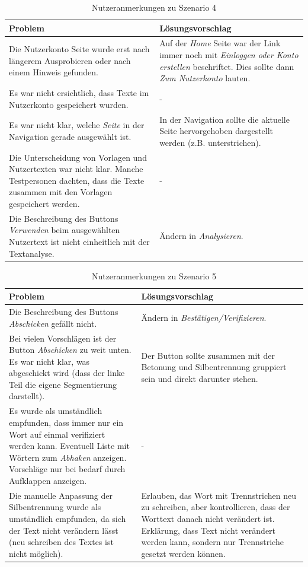 \begin{table}
	\centering
	\begin{tabular}{|p{}|p{}|}
		\hline
		\textbf{Problem} & \textbf{Lösungsvorschlag}\\
		\hline
		\hline
		Die Nutzerkonto Seite wurde erst nach längerem Ausprobieren oder nach einem Hinweis gefunden. & Auf der \textit{Home} Seite war der Link immer noch mit \textit{Einloggen oder Konto erstellen} beschriftet. Dies sollte dann \textit{Zum Nutzerkonto} lauten.\\
		\hline
		Es war nicht ersichtlich, dass Texte im Nutzerkonto gespeichert wurden. & -\\
		\hline
		Es war nicht klar, welche \textit{Seite} in der Navigation gerade ausgewählt ist. & In der Navigation sollte die aktuelle Seite hervorgehoben dargestellt werden (z.B. unterstrichen).\\
		\hline
		Die Unterscheidung von Vorlagen und Nutzertexten war nicht klar. Manche Testpersonen dachten, dass die Texte zusammen mit den Vorlagen gespeichert werden. & -\\
		\hline
		Die Beschreibung des Buttons \textit{Verwenden} beim ausgewählten Nutzertext ist nicht einheitlich mit der Textanalyse. & Ändern in \textit{Analysieren}.\\
		\hline
	\end{tabular}
	\caption{Nutzeranmerkungen zu Szenario 4}
	\label{table:szenario4}
\end{table}


\begin{table}
	\centering
	\begin{tabular}{|p{}|p{}|}
		\hline
		\textbf{Problem} & \textbf{Lösungsvorschlag}\\
		\hline
		\hline
		Die Beschreibung des Buttons \textit{Abschicken} gefällt nicht. & Ändern in \textit{Bestätigen/Verifizieren}.\\
		\hline
		Bei vielen Vorschlägen ist der Button \textit{Abschicken} zu weit unten. Es war nicht klar, was abgeschickt wird (dass der linke Teil die eigene Segmentierung darstellt). & Der Button sollte zusammen mit der Betonung und Silbentrennung gruppiert sein und direkt darunter stehen.\\
		\hline
		Es wurde als umständlich empfunden, dass immer nur ein Wort auf einmal verifiziert werden kann.
		Eventuell Liste mit Wörtern zum \textit{Abhaken} anzeigen. Vorschläge nur bei bedarf durch Aufklappen anzeigen.
		& -\\
		\hline
		Die manuelle Anpassung der Silbentrennung wurde als umständlich empfunden, da sich der Text nicht verändern lässt (neu schreiben des Textes ist nicht möglich). & Erlauben, das Wort mit Trennstrichen neu zu schreiben, aber kontrollieren, dass der Worttext danach nicht verändert ist.
		Erklärung, dass Text nicht verändert werden kann, sondern nur Trennstriche gesetzt werden können.\\
		\hline
	\end{tabular}
	\caption{Nutzeranmerkungen zu Szenario 5}
	\label{table:szenario5}
\end{table}